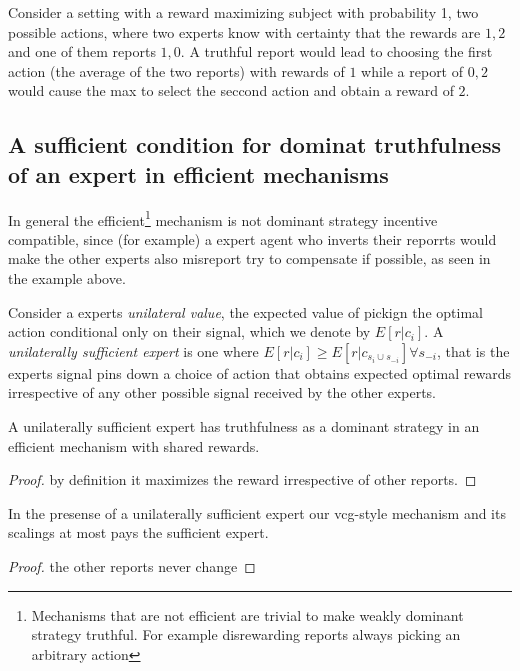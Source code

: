 \begin{eg}
	Consider a setting with a reward maximizing subject with probability 1, two possible actions, where two experts know with certainty that the rewards are $1,2$ and one of them reports $1,0$. A truthful report would lead to choosing the first action (the average of the two reports) with rewards of $1$ while a report of $0,2$ would cause the max to select the seccond action and obtain a reward of $2$.
\end{eg}


\subsection{A sufficient condition for dominat truthfulness of an expert in efficient mechanisms}

In general the efficient\footnote{Mechanisms that are not efficient are trivial to make weakly dominant strategy truthful. For example disrewarding reports always picking an arbitrary action} mechanism is not dominant strategy incentive compatible, since (for example) a expert agent who inverts their reporrts would make the other experts also misreport try to compensate if possible, as seen in the example above.

Consider a experts \emph{unilateral value}, the expected value of pickign the optimal action conditional only on their signal, which we denote by  $E[ r| c_{i}]$. A \emph{unilaterally sufficient expert} is one where $E[r|c_{i}] \geq E[r|c_{s_i \cup s_{-i}}] \forall s_{-i}$, that is the experts signal pins down a choice of action that obtains expected optimal rewards irrespective of any other possible signal received by the other experts.

\begin{lem}
	A unilaterally sufficient expert has truthfulness as a dominant strategy in an efficient mechanism with shared rewards.
\end{lem}

\begin{proof}
    by definition it maximizes the reward irrespective of other reports.
\end{proof}

\begin{lem}
	In the presense of a unilaterally sufficient expert our vcg-style mechanism and its scalings at most pays the sufficient expert.
\end{lem}

\begin{proof}
    the other reports never change 
\end{proof}


